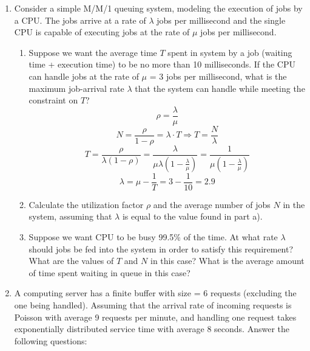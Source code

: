 \documentclass[10.5pt,letterpaper]{article}
\begin{document}
\begin{enumerate}[label=\textbf{Problem \arabic*.}]
\item Consider a simple M/M/1 queuing system, modeling the execution of jobs by a CPU. The jobs arrive at a rate of $\lambda$ jobs per millisecond and the single CPU is capable of executing jobs at the rate of $\mu$ jobs per millisecond.
	\begin{enumerate}[label=\alph*)]
	\item Suppose we want the average time $T$ spent in system by a job (waiting time + execution time) to be no more than 10 milliseconds. If the CPU can handle jobs at the rate of $\mu$ = 3 jobs per millisecond, what is the maximum job-arrival rate $\lambda$ that the system can handle while meeting the constraint on $T$?
	\[\rho = \frac{\lambda}{\mu}\]
	\[N = \frac{\rho}{1-\rho} = \lambda \cdot T \Rightarrow T = \frac{N}{\lambda}\]
	\[T = \frac{\rho}{\lambda(1-\rho)} = \frac{\lambda}{\mu\lambda(1-\frac{\lambda}{\mu})} = \frac{1}{\mu(1-\frac{\lambda}{\mu})}\] 
	\[\lambda = \mu - \frac{1}{T} = 3 - \frac{1}{10} = \boxed{2.9}\]
	\item Calculate the utilization factor $\rho$ and the average number of jobs $N$ in the system, assuming that $\lambda$ is equal to the value found in part a).\\
	\fbox{\parbox{\textwidth}{\[\rho = \frac{\lambda}{\mu} = \frac{2.9}{3}\]
	\[N = \frac{\rho}{1-\rho} = \frac{\frac{2.9}{3}}{1-\frac{2.9}{3}} = 29 \text{ jobs}\]}}
	\item  Suppose we want CPU to be busy 99.5\% of the time. At what rate $\lambda$ should jobs be fed into the system in order to satisfy this requirement? What are the values of $T$ and $N$ in this case? What is the average amount of time spent waiting in queue in this case?\\
	\fbox{\parbox{\textwidth}{\[\rho = \frac{\lambda}{\mu} \Rightarrow \lambda = \rho\mu = 0.995 \times 3 = 2.985\]
	\[T = \frac{\rho}{\lambda(1-\rho)} = \frac{0.995}{2.985(1-0.995)} = \frac{200}{3}\]
	\[N = T\cdot\lambda = \frac{200}{3} \times 2.985 = 199\]
	\[W = T - \frac{1}{\mu} = \frac{200}{3} - \frac{1}{3} = \frac{199}{3} \text{ milliseconds} \]}}
	\end{enumerate}
\item A computing server has a finite buffer with size = 6 requests (excluding the one being handled). Assuming that the arrival rate of incoming requests is Poisson with average 9 requests per minute, and handling one request takes exponentially distributed service time with average 8 seconds. Answer the following questions:
	\begin{itemize}

\end{itemize}
\end{enumerate}
\end{document}

